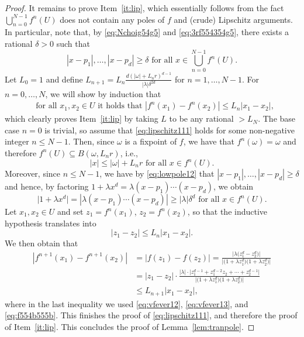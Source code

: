 \documentclass[11pt]{article}
\newcommand{\fn}[2]{#1^{#2}}
\begin{document}
\begin{proof}
 
It remains to prove Item~\ref{it:lip}, which essentially follows from the fact $\bigcup^{N-1}_{n=0}\fn{f}{n}(U)$ does not contain any poles of $f$ and (crude) Lipschitz arguments. In particular, note that, by \eqref{eq:Nchoig54g5} and \eqref{eq:3rf554354g5}, there exists a rational $\delta>0$ such that 
\begin{equation}\label{eq:lowpole12}
|x-p_1|,\hdots, |x-p_d|\geq \delta \mbox{ for all } x\in\bigcup^{N-1}_{n=0}\fn{f}{n}(U).
\end{equation}
Let $L_0=1$ and define $L_{n+1}=L_n\frac{d (|\omega|+L_n r)^{d-1}}{|\lambda| \delta^{2d}}$ for $n=1,\hdots,N-1$. For $n=0,\hdots,N$, we will show by induction that  
\begin{align}
&\mbox{for all $x_1,x_2\in U$ it holds that $|\fn{f}{n}(x_1)-\fn{f}{n}(x_2)|\leq L_n|x_1-x_2|$},\label{eq:lipschitz111}
\end{align}
which clearly proves Item~\ref{it:lip} by taking $L$ to be any rational $>L_N$. The base case $n=0$ is trivial,  so assume that \eqref{eq:lipschitz111} holds  for some non-negative integer $n\leq N-1$. Then, since $\omega$ is a fixpoint of $f$, we have that $\fn{f}{n}(\omega)=\omega$ and therefore $\fn{f}{n}(U)\subseteq B(\omega,L_n r)$, i.e.,
\begin{equation}\label{eq:vfever12}
|x|\leq |\omega|+L_n r \mbox{ for all } x\in \fn{f}{n}(U).
\end{equation} 
Moreover, since $n\leq N-1$, we have by \eqref{eq:lowpole12}  that $|x-p_1|,\hdots, |x-p_d|\geq \delta$ and hence, by factoring $1+\lambda x^d=\lambda(x-p_1)\cdots(x-p_d)$, we obtain
\begin{equation}\label{eq:vfever13}
\big|1+\lambda x^{d}\big|=|\lambda(x-p_1)\cdots(x-p_d)|\geq |\lambda| \delta^{d}\mbox{ for all } x\in \fn{f}{n}(U).
\end{equation}
Let $x_1,x_2\in U$ and set $z_1=\fn{f}{n}(x_1)$, $z_2=\fn{f}{n}(x_2)$, so that the inductive hypothesis translates into 
\begin{equation}\label{eq:f554b555b}
|z_1-z_2|\leq L_n|x_1-x_2|.
\end{equation}  We then obtain that 
\begin{align*}
|\fn{f}{n+1}(x_1)-\fn{f}{n+1}(x_2)|&=|f(z_1)-f(z_2)|=\frac{\big|\lambda\big(z_1^{d}-z_2^{d}\big)\big|}{\big|\big(1+\lambda z_1^{d}\big)\big(1+\lambda z_2^{d}\big)\big|}\\
&=|z_1-z_2| \cdot \frac{|\lambda|\cdot \big|z_1^{d-1}+z_1^{d-2}z_2+\cdots+z_2^{d-1}\big|}{\big|\big(1+\lambda z_1^{d}\big)\big(1+\lambda z_2^{d}\big)\big|}\\
&\leq L_{n+1} |x_1-x_2|,
\end{align*}
where in the last inequality we used \eqref{eq:vfever12}, \eqref{eq:vfever13}, and \eqref{eq:f554b555b}. This finishes the proof of \eqref{eq:lipschitz111}, and therefore the proof of Item~\ref{it:lip}. This concludes the proof of Lemma~\ref{lem:tranpole}.
\end{proof}
\end{document}
